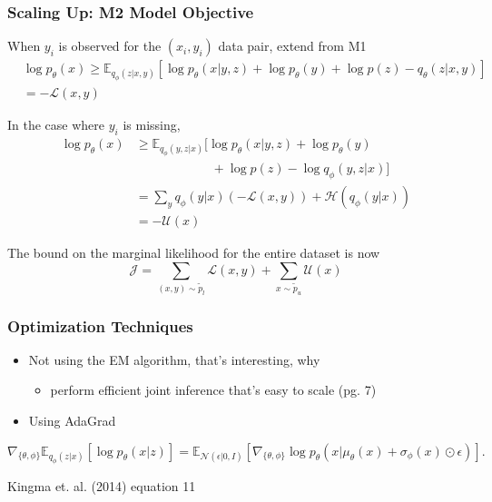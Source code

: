 \documentclass{beamer}
\begin{document}
\begin{frame}
  \frametitle{Scaling Up: M2 Model Objective}

  When $y_i$ is observed for the $(x_i,y_i)$ data pair, extend from M1
  \begin{align*}
    &\log p_\theta (x) \ge \mathbb{E}_{q_\phi (z|x,y)}
       [\log p_\theta (x|y,z) + \log p_\theta (y) + \log p(z) -
         q_\theta (z|x,y)] \\
       &= - \mathcal{L}(x,y)
  \end{align*}

  In the case where $y_i$ is missing,
  \begin{align*}
    \log p_\theta (x) &\ge \mathbb{E}_{q_\phi (y,z|x)}
         [\log p_\theta (x|y,z) + \log p_\theta (y) \\
           &\qquad\qquad\qquad + \log p(z) - \log q_\phi (y,z|x)] \\
         &= \sum_y q_\phi (y|x) ( - \mathcal{L}(x,y))
         + \mathcal{H}(q_\phi (y|x)) \\
         &= - \mathcal{U}(x)
  \end{align*}

  The bound on the marginal likelihood for the entire dataset is
  now\footnotemark
  \[
  \mathcal{J} = \sum_{(x,y) \sim \tilde{p}_l} \mathcal{L}(x,y)
    + \sum_{x \sim \tilde{p}_u} \mathcal{U}(x)
    \]

\end{frame}

\begin{frame}
  \frametitle{Optimization Techniques}

  \begin{itemize}
  \item Not using the EM algorithm, that's interesting, why
    \begin{itemize}
      \item perform efficient joint inference that's easy to scale (pg. 7)
      \end{itemize}
  \item Using AdaGrad
    \end{itemize}
  

  \[
  \nabla_{\{\theta, \phi\}} \mathbb{E}_{q_\phi (z|x)}
        [\log p_\theta (x|z)] = \mathbb{E}_{\mathcal{N}(\epsilon | 0, I)}
        [\nabla_{\{\theta, \phi\}} \log p_\theta (x |\mu_\theta (x)
          + \sigma_\phi (x) \odot \epsilon)]. 
        \]

        Kingma et. al. (2014) equation 11
\end{frame}
\end{document}
